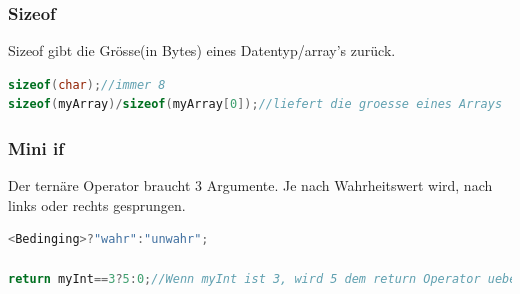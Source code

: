 \subsubsection{Sizeof}

Sizeof gibt die Grösse(in Bytes) eines Datentyp/array's zurück.

\begin{lstlisting}[language = c]
sizeof(char);//immer 8
sizeof(myArray)/sizeof(myArray[0]);//liefert die groesse eines Arrays
\end{lstlisting}

\subsubsection{Mini if}

Der ternäre Operator braucht 3 Argumente. Je nach Wahrheitswert wird, nach links oder rechts gesprungen.
\begin{lstlisting}[language = c]
<Bedinging>?"wahr":"unwahr";

return myInt==3?5:0;//Wenn myInt ist 3, wird 5 dem return Operator uebergeben. Ansonsten wird 0 uebergeben

\end{lstlisting}

